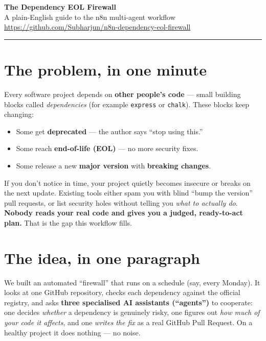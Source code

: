 \documentclass[11pt,a4paper]{article}
\begin{document}
\begin{center}
  {\Huge\bfseries\color{ink} The Dependency EOL Firewall}\\[4pt]
  {\large A plain-English guide to the n8n multi-agent workflow}\\[8pt]
  {\small\color{ink}\url{https://github.com/Subharjun/n8n-dependency-eol-firewall}}
\end{center}
\vspace{6pt}
\hrule
\vspace{14pt}

\section{The problem, in one minute}

Every software project depends on \textbf{other people's code} --- small building blocks called
\emph{dependencies} (for example \texttt{express} or \texttt{chalk}). These blocks keep changing:

\begin{itemize}[leftmargin=1.4em]
  \item Some get \textbf{deprecated} --- the author says ``stop using this.''
  \item Some reach \textbf{end-of-life (EOL)} --- no more security fixes.
  \item Some release a new \textbf{major version} with \textbf{breaking changes}.
\end{itemize}

If you don't notice in time, your project quietly becomes insecure or breaks on the next update.
Existing tools either spam you with blind ``bump the version'' pull requests, or list security holes
without telling you \emph{what to actually do}. \textbf{Nobody reads your real code and gives you a
judged, ready-to-act plan.} That is the gap this workflow fills.

\section{The idea, in one paragraph}

We built an automated ``firewall'' that runs on a schedule (say, every Monday). It looks at one GitHub
repository, checks each dependency against the official registry, and asks \textbf{three specialised AI
assistants (``agents'')} to cooperate: one decides \emph{whether} a dependency is genuinely risky,
one figures out \emph{how much of your code it affects}, and one \emph{writes the fix} as a real
GitHub Pull Request. On a healthy project it does nothing --- no noise.
\end{document}
